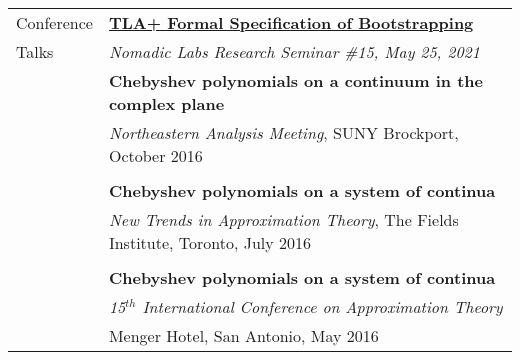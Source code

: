 \documentclass[letterpaper,10pt,oneside]{article}
\begin{document}
\noindent \begin{tabular}{@{} l l}
 \Large{Conference} & \href{https://www.youtube.com/watch?v=WgO2hHt2GrQ}{\textbf{TLA+ Formal Specification of Bootstrapping}} \\
 \Large{Talks} & \emph{Nomadic Labs Research Seminar \#15, May 25, 2021} \\
 \hspace{1.1in} & \textbf{Chebyshev polynomials on a continuum in the complex plane}  \\
 & \emph{Northeastern Analysis Meeting}, SUNY Brockport, October 2016 \\
 & \\
 & \textbf{Chebyshev polynomials on a system of continua} \\
 & \emph{New Trends in Approximation Theory}, The Fields Institute, Toronto, July 2016 \\
 & \\
 & \textbf{Chebyshev polynomials on a system of continua} \\
 & \emph{15$^{th}$ International Conference on Approximation Theory} \\
 & Menger Hotel, San Antonio, May 2016 \\
\end{tabular}

\vfill

\end{document}
